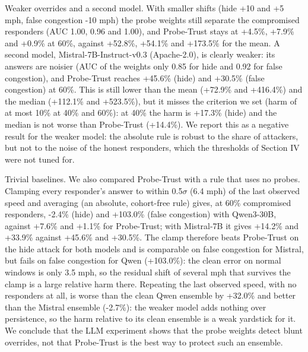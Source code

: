 \documentclass[journal]{IEEEtran}
\begin{document}
Weaker overrides and a second model. With smaller shifts (hide +10 and +5 mph, false congestion -10 mph) the probe weights still separate the compromised responders (AUC 1.00, 0.96 and 1.00), and Probe-Trust stays at +4.5\%, +7.9\% and +0.9\% at 60\%, against +52.8\%, +54.1\% and +173.5\% for the mean. A second model, Mistral-7B-Instruct-v0.3 (Apache-2.0), is clearly weaker: its answers are noisier (AUC of the weights only 0.85 for hide and 0.92 for false congestion), and Probe-Trust reaches +45.6\% (hide) and +30.5\% (false congestion) at 60\%. This is still lower than the mean (+72.9\% and +416.4\%) and the median (+112.1\% and +523.5\%), but it misses the criterion we set (harm of at most 10\% at 40\% and 60\%): at 40\% the harm is +17.3\% (hide) and the median is not worse than Probe-Trust (+14.4\%). We report this as a negative result for the weaker model: the absolute rule is robust to the share of attackers, but not to the noise of the honest responders, which the thresholds of Section IV were not tuned for.

Trivial baselines. We also compared Probe-Trust with a rule that uses no probes. Clamping every responder's answer to within 0.5\ensuremath{\sigma} (6.4 mph) of the last observed speed and averaging (an absolute, cohort-free rule) gives, at 60\% compromised responders, -2.4\% (hide) and +103.0\% (false congestion) with Qwen3-30B, against +7.6\% and +1.1\% for Probe-Trust; with Mistral-7B it gives +14.2\% and +33.9\% against +45.6\% and +30.5\%. The clamp therefore beats Probe-Trust on the hide attack for both models and is comparable on false congestion for Mistral, but fails on false congestion for Qwen (+103.0\%): the clean error on normal windows is only 3.5 mph, so the residual shift of several mph that survives the clamp is a large relative harm there. Repeating the last observed speed, with no responders at all, is worse than the clean Qwen ensemble by +32.0\% and better than the Mistral ensemble (-2.7\%): the weaker model adds nothing over persistence, so the harm relative to its clean ensemble is a weak yardstick for it. We conclude that the LLM experiment shows that the probe weights detect blunt overrides, not that Probe-Trust is the best way to protect such an ensemble.
\end{document}
